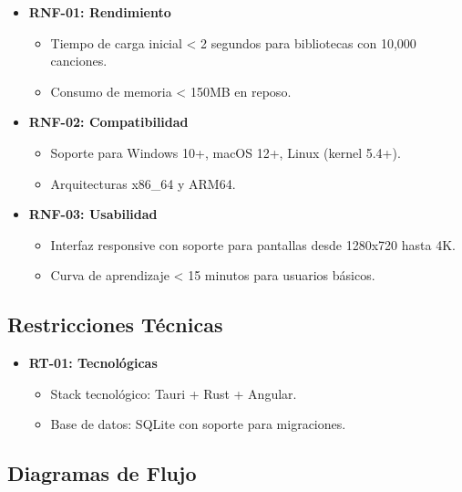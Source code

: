 \documentclass[11pt, a4paper]{article}
\begin{document}
  \begin{itemize}
  \item \textbf{RNF-01: Rendimiento}
    \begin{itemize}
      \item Tiempo de carga inicial < 2 segundos para bibliotecas con 10,000 canciones.
      \item Consumo de memoria < 150MB en reposo.
    \end{itemize}

  \item \textbf{RNF-02: Compatibilidad}
    \begin{itemize}
      \item Soporte para Windows 10+, macOS 12+, Linux (kernel 5.4+).
      \item Arquitecturas x86\_64 y ARM64.
    \end{itemize}

  \item \textbf{RNF-03: Usabilidad}
    \begin{itemize}
      \item Interfaz responsive con soporte para pantallas desde 1280x720 hasta 4K.
      \item Curva de aprendizaje < 15 minutos para usuarios básicos.
    \end{itemize}
  \end{itemize}

  \subsection{Restricciones Técnicas}

  \begin{itemize}
    \item \textbf{RT-01: Tecnológicas}
    \begin{itemize}
      \item Stack tecnológico: Tauri + Rust + Angular.
      \item Base de datos: SQLite con soporte para migraciones.
    \end{itemize}

  \end{itemize}

  \subsection{Diagramas de Flujo}
\end{document}
